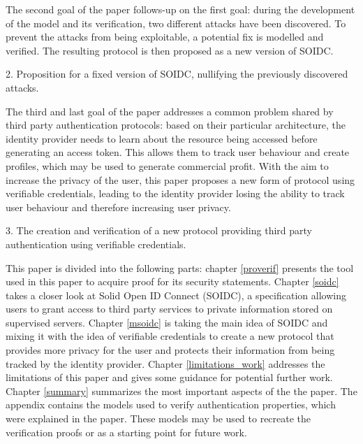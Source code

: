 \documentclass[11pt,twoside,a4paper,openright]{book}
\begin{document}
The second goal of the paper follows-up on the first goal: during the development of the model and its verification, two different attacks have been discovered. To prevent the attacks from being exploitable, a potential fix is modelled and verified. The resulting protocol is then proposed as a new version of SOIDC.

\begin{mdframed}
2. Proposition for a fixed version of SOIDC, nullifying the previously discovered attacks.
\end{mdframed}

The third and last goal of the paper addresses a common problem shared by third party authentication protocols: based on their particular architecture, the identity provider needs to learn about the resource being accessed before generating an access token. This allows them to track user behaviour and create profiles, which may be used to generate commercial profit. With the aim to increase the privacy of the user, this paper proposes a new form of protocol using verifiable credentials, leading to the identity provider losing the ability to track user behaviour and therefore increasing user privacy.

\begin{mdframed}
3. The creation and verification of a new protocol providing third party authentication using verifiable credentials.
\end{mdframed}

This paper is divided into the following parts: chapter \ref{proverif} presents the tool used in this paper to acquire proof for its security statements. Chapter \ref{soidc} takes a closer look at Solid Open ID Connect (SOIDC), a specification allowing users to grant access to third party services to private information stored on supervised servers. Chapter \ref{msoidc} is taking the main idea of SOIDC and mixing it with the idea of verifiable credentials to create a new protocol that provides more privacy for the user and protects their information from being tracked by the identity provider. Chapter \ref{limitations_work} addresses the limitations of this paper and gives some guidance for potential further work. Chapter \ref{summary} summarizes the most important aspects of the the paper. The appendix contains the models used to verify authentication properties, which were explained in the paper. These models may be used to recreate the verification proofs or as a starting point for future work.

\end{document}
